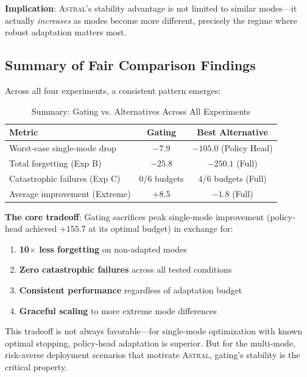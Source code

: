 \documentclass{article}
\newcommand{\astral}{\textsc{Astral}}
\newcommand{\method}{\astral}
\begin{document}
\textbf{Implication}: \method{}'s stability advantage is not limited to similar modes---it actually \emph{increases} as modes become more different, precisely the regime where robust adaptation matters most.

\subsection{Summary of Fair Comparison Findings}

Across all four experiments, a consistent pattern emerges:

\begin{table}[h]
\centering
\caption{Summary: Gating vs. Alternatives Across All Experiments}
\label{tab:summary}
\begin{tabular}{@{}lcc@{}}
\toprule
\textbf{Metric} & \textbf{Gating} & \textbf{Best Alternative} \\
\midrule
Worst-case single-mode drop & $-7.9$ & $-105.0$ (Policy Head) \\
Total forgetting (Exp B) & $-25.8$ & $-250.1$ (Full) \\
Catastrophic failures (Exp C) & 0/6 budgets & 4/6 budgets (Full) \\
Average improvement (Extreme) & $+8.5$ & $-1.8$ (Full) \\
\bottomrule
\end{tabular}
\end{table}

\textbf{The core tradeoff}: Gating sacrifices peak single-mode improvement (policy-head achieved $+155.7$ at its optimal budget) in exchange for:
\begin{enumerate}
    \item \textbf{10$\times$ less forgetting} on non-adapted modes
    \item \textbf{Zero catastrophic failures} across all tested conditions
    \item \textbf{Consistent performance} regardless of adaptation budget
    \item \textbf{Graceful scaling} to more extreme mode differences
\end{enumerate}

This tradeoff is not always favorable---for single-mode optimization with known optimal stopping, policy-head adaptation is superior. But for the multi-mode, risk-averse deployment scenarios that motivate \method{}, gating's stability is the critical property.

\end{document}
